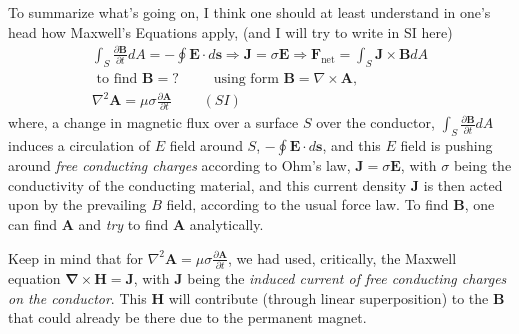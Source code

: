 \documentclass[10pt]{amsart}
\begin{document}
\begin{multicols*}{2}
To summarize what's going on, I think one should at least understand in one's head how Maxwell's Equations apply, (and I will try to write in SI here)
\begin{equation}
\boxed{
\begin{gathered}
\int_S \frac{ \partial \mathbf{B}}{ \partial t} dA = -\oint \mathbf{E}\cdot d\mathbf{s} \Longrightarrow \mathbf{J}=\sigma \mathbf{E} \Longrightarrow \mathbf{F}_{\text{net}} = \int_S \mathbf{J} \times \mathbf{B} dA  \\
\text{ to find } \mathbf{B} = ? \qquad \, \text{ using form } \mathbf{B} = \nabla \times \mathbf{A}, \\
\nabla^2 \mathbf{A} = \mu \sigma \frac{ \partial \mathbf{A} }{ \partial t} \qquad \, (SI)
\end{gathered}
}
\end{equation}
where, a change in magnetic flux over a surface $S$ over the conductor, $\int_S \frac{ \partial \mathbf{B}}{ \partial t}dA$ induces a circulation of $E$ field around $S$, $-\oint \mathbf{E} \cdot d\mathbf{s}$, and this $E$ field is pushing around \emph{free conducting charges} according to Ohm's law, $\mathbf{J} = \sigma \mathbf{E}$, with $\sigma$ being the conductivity of the conducting material, and this current density $\mathbf{J}$ is then acted upon by the prevailing $B$ field, according to the usual force law.  To find $\mathbf{B}$, one can find $\mathbf{A}$ and \emph{try} to find $\mathbf{A}$ analytically.  

Keep in mind that for $\nabla^2 \mathbf{A} = \mu \sigma \frac{ \partial \mathbf{A}}{ \partial t}$, we had used, critically, the Maxwell equation $\mathbf{\nabla} \times \mathbf{H} = \mathbf{J}$, with $\mathbf{J}$ being the \emph{induced current of free conducting charges on the conductor}.  This $\mathbf{H}$ will contribute (through linear superposition) to the $\mathbf{B}$ that could already be there due to the permanent magnet.  


\end{multicols*}
\end{document}
